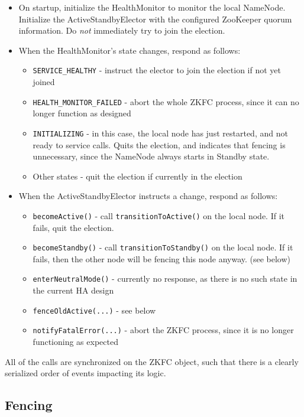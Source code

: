 \documentclass{article}
\begin{document}
\begin{itemize}
\item On startup, initialize the HealthMonitor to monitor the local NameNode. Initialize the ActiveStandbyElector with the configured ZooKeeper quorum information. Do {\em not} immediately try to join the election.
\item When the HealthMonitor's state changes, respond as follows:
  \begin{itemize}
  \item {\tt SERVICE\_HEALTHY} - instruct the elector to join the election if not yet joined
  \item {\tt HEALTH\_MONITOR\_FAILED} - abort the whole ZKFC process, since it can no longer function as designed
  \item {\tt INITIALIZING} - in this case, the local node has just restarted, and not ready to service calls. Quits the election, and indicates that fencing is unnecessary, since the NameNode always starts in Standby state.
  \item Other states - quit the election if currently in the election
  \end{itemize}
\item When the ActiveStandbyElector instructs a change, respond as follows:
  \begin{itemize}
  \item {\tt becomeActive()} - call {\tt transitionToActive()} on the local node. If it fails, quit the election.
  \item {\tt becomeStandby()} - call {\tt transitionToStandby()} on the local node. If it fails, then the other node will be fencing this node anyway. (see below)
  \item {\tt enterNeutralMode()} - currently no response, as there is no such state in the current HA design
  \item {\tt fenceOldActive(...)} - see below
  \item {\tt notifyFatalError(...)} - abort the ZKFC process, since it is no longer functioning as expected
  \end{itemize}
\end{itemize}

All of the calls are synchronized on the ZKFC object, such that there is a clearly serialized order of events impacting its logic.

\subsection{Fencing}
\end{document}
